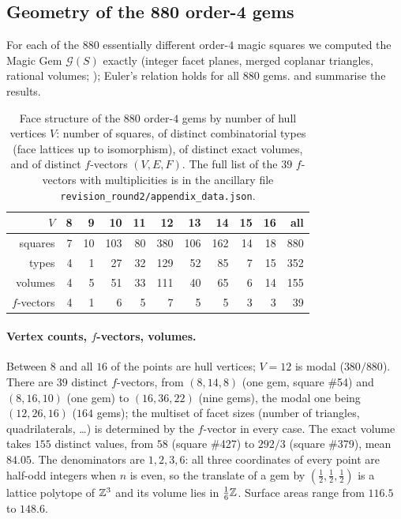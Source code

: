 \subsection{Geometry of the 880 order-4 gems}
\label{sec:gem-geometry-880}

For each of the $880$ essentially different order-$4$ magic squares we computed the Magic Gem $\mathcal G(S)$ exactly
(integer facet planes, merged coplanar triangles, rational volumes; ); Euler's relation holds for all
$880$ gems.   and  summarise the results.

\begin{table}[htbp]
\centering
\caption{Face structure of the $880$ order-$4$ gems by number of hull vertices $V$: number of squares, of distinct
combinatorial types (face lattices up to isomorphism), of distinct exact volumes, and of distinct $f$-vectors $(V,E,F)$.
The full list of the $39$ $f$-vectors with multiplicities is in the ancillary file \texttt{revision\_round2/appendix\_data.json}.}
\label{tab:gem-fvectors}
\small
\begin{tabular}{r rrrrrrrrr r}
\toprule
$V$ & 8 & 9 & 10 & 11 & 12 & 13 & 14 & 15 & 16 & all\\
\midrule
squares & 7 & 10 & 103 & 80 & 380 & 106 & 162 & 14 & 18 & 880\\
types   & 4 & 1 & 27 & 32 & 129 & 52 & 85 & 7 & 15 & 352\\
volumes & 4 & 5 & 51 & 33 & 111 & 40 & 65 & 6 & 14 & 155\\
$f$-vectors & 4 & 1 & 6 & 5 & 7 & 5 & 5 & 3 & 3 & 39\\
\bottomrule
\end{tabular}
\end{table}

\paragraph{Vertex counts, $f$-vectors, volumes.}
Between $8$ and all $16$ of the points are hull vertices; $V=12$ is modal ($380/880$).  There are $39$ distinct $f$-vectors,
from $(8,14,8)$ (one gem, square \#54) and $(8,16,10)$ (one gem) to $(16,36,22)$ (nine gems), the modal one being
$(12,26,16)$ ($164$ gems); the multiset of facet sizes (number of triangles, quadrilaterals, \dots) is determined by the
$f$-vector in every case.  The exact volume takes $155$ distinct values, from
$58$ (square \#427) to $292/3$ (square \#379), mean $84.05$.  The denominators are $1,2,3,6$: all three
coordinates of every point are half-odd integers when $n$ is even, so the translate of a gem by $(\frac12,\frac12,\frac12)$ is a
lattice polytope of $\mathbb{Z}^3$ and its volume lies in $\frac16\mathbb{Z}$.
Surface areas range from $116.5$ to $148.6$.


